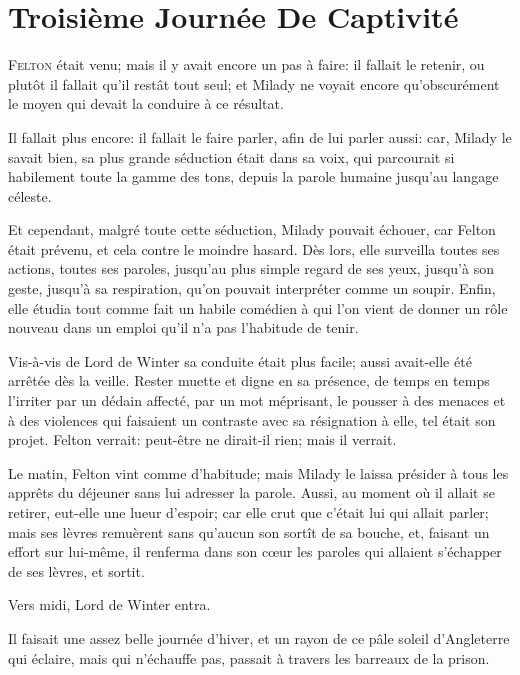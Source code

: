 
\chapter{Troisième Journée De Captivité}

\lettrine{F}{elton} était venu; mais il y avait encore un pas à faire: il fallait le retenir, ou plutôt il fallait qu'il restât tout seul; et Milady ne voyait encore qu'obscurément le moyen qui devait la conduire à ce résultat. 

Il fallait plus encore: il fallait le faire parler, afin de lui parler aussi: car, Milady le savait bien, sa plus grande séduction était dans sa voix, qui parcourait si habilement toute la gamme des tons, depuis la parole humaine jusqu'au langage céleste. 

Et cependant, malgré toute cette séduction, Milady pouvait échouer, car Felton était prévenu, et cela contre le moindre hasard. Dès lors, elle surveilla toutes ses actions, toutes ses paroles, jusqu'au plus simple regard de ses yeux, jusqu'à son geste, jusqu'à sa respiration, qu'on pouvait interpréter comme un soupir. Enfin, elle étudia tout comme fait un habile comédien à qui l'on vient de donner un rôle nouveau dans un emploi qu'il n'a pas l'habitude de tenir. 

Vis-à-vis de Lord de Winter sa conduite était plus facile; aussi avait-elle été arrêtée dès la veille. Rester muette et digne en sa présence, de temps en temps l'irriter par un dédain affecté, par un mot méprisant, le pousser à des menaces et à des violences qui faisaient un contraste avec sa résignation à elle, tel était son projet. Felton verrait: peut-être ne dirait-il rien; mais il verrait. 

Le matin, Felton vint comme d'habitude; mais Milady le laissa présider à tous les apprêts du déjeuner sans lui adresser la parole. Aussi, au moment où il allait se retirer, eut-elle une lueur d'espoir; car elle crut que c'était lui qui allait parler; mais ses lèvres remuèrent sans qu'aucun son sortît de sa bouche, et, faisant un effort sur lui-même, il renferma dans son cœur les paroles qui allaient s'échapper de ses lèvres, et sortit. 

Vers midi, Lord de Winter entra. 

Il faisait une assez belle journée d'hiver, et un rayon de ce pâle soleil d'Angleterre qui éclaire, mais qui n'échauffe pas, passait à travers les barreaux de la prison. 

